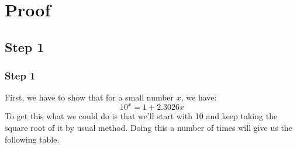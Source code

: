 \documentclass{beamer}
\begin{document}
\section{Proof}
\subsection{Step 1}
\begin{frame}
\frametitle{Step 1}
First, we have to show that for a small number $x$, we have:
\begin{equation}
    \label{eq:2}
    10^x = 1 + 2.3026x
\end{equation}
To get this what we could do is that we'll start with 10 and keep taking the square root of it by usual method. Doing this a number of times will give us the following table.
\end{frame}
\end{document}
